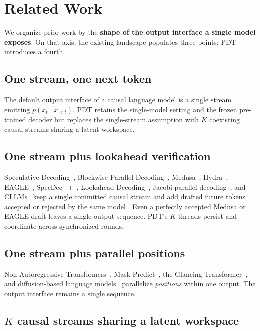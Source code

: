 \section{Related Work}

We organize prior work by the \textbf{shape of the output interface a single model exposes}. On that axis, the existing landscape populates three points; PDT introduces a fourth.

\subsection{One stream, one next token}

The default output interface of a causal language model is a single stream emitting $p(x_t \mid x_{<t})$. PDT retains the single-model setting and the frozen pre-trained decoder but replaces the single-stream assumption with $K$ coexisting causal streams sharing a latent workspace.

\subsection{One stream plus lookahead verification}

Speculative Decoding~\cite{leviathan2023fast}, Blockwise Parallel Decoding~\cite{Stern2018}, Medusa~\cite{cai2024medusa}, Hydra~\cite{Ankner2024Hydra}, EAGLE~\cite{EAGLE2024}, SpecDec++~\cite{Huang2024SpecDecPP}, Lookahead Decoding~\cite{Li2024lookahead}, Jacobi parallel decoding~\cite{Santilli2023Jacobi}, and CLLMs~\cite{Kou2024CLLM} keep a single committed causal stream and add drafted future tokens accepted or rejected by the same model \cite{Yan2024,survey2025}. Even a perfectly accepted Medusa or EAGLE draft leaves a single output sequence. PDT's $K$ threads persist and coordinate across synchronized rounds.

\subsection{One stream plus parallel positions}

Non-Autoregressive Transformers~\cite{Gu2018NAT}, Mask-Predict~\cite{Ghazvininejad2019MaskPredict}, the Glancing Transformer~\cite{Qian2021GLAT}, and diffusion-based language models~\cite{Li2022DiffusionLM,Lou2024SEDD} parallelize \emph{positions} within one output. The output interface remains a single sequence.

\subsection{$K$ causal streams sharing a latent workspace}

